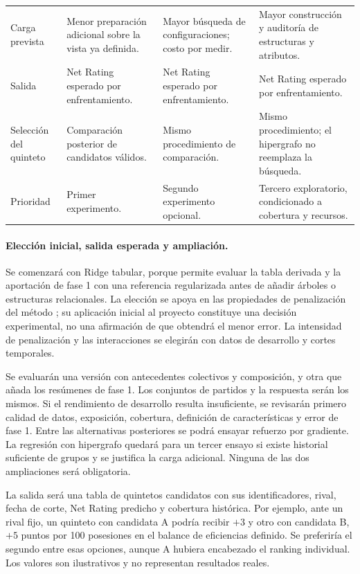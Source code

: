 \begin{longtable}{@{}>{\raggedright\arraybackslash}p{2.3cm}>{\raggedright\arraybackslash}p{3.55cm}>{\raggedright\arraybackslash}p{3.55cm}>{\raggedright\arraybackslash}p{3.55cm}@{}}
Carga prevista & Menor preparación adicional sobre la vista ya definida. & Mayor búsqueda de configuraciones; costo por medir. & Mayor construcción y auditoría de estructuras y atributos.\\
Salida & Net Rating esperado por enfrentamiento. & Net Rating esperado por enfrentamiento. & Net Rating esperado por enfrentamiento.\\
Selección del quinteto & Comparación posterior de candidatos válidos. & Mismo procedimiento de comparación. & Mismo procedimiento; el hipergrafo no reemplaza la búsqueda.\\
Prioridad & Primer experimento. & Segundo experimento opcional. & Tercero exploratorio, condicionado a cobertura y recursos.\\
\end{longtable}
\endgroup

\paragraph*{Elección inicial, salida esperada y ampliación.}
Se comenzará con Ridge tabular, porque permite evaluar la tabla derivada y la aportación de fase 1 con una referencia regularizada antes de añadir árboles o estructuras relacionales. La elección se apoya en las propiedades de penalización del método \cite{hoerl1970ridge}; su aplicación inicial al proyecto constituye una decisión experimental, no una afirmación de que obtendrá el menor error. La intensidad de penalización y las interacciones se elegirán con datos de desarrollo y cortes temporales.

Se evaluarán una versión con antecedentes colectivos y composición, y otra que añada los resúmenes de fase 1. Los conjuntos de partidos y la respuesta serán los mismos. Si el rendimiento de desarrollo resulta insuficiente, se revisarán primero calidad de datos, exposición, cobertura, definición de características y error de fase 1. Entre las alternativas posteriores se podrá ensayar refuerzo por gradiente. La regresión con hipergrafo quedará para un tercer ensayo si existe historial suficiente de grupos y se justifica la carga adicional. Ninguna de las dos ampliaciones será obligatoria.

La salida será una tabla de quintetos candidatos con sus identificadores, rival, fecha de corte, Net Rating predicho y cobertura histórica. Por ejemplo, ante un rival fijo, un quinteto con candidata A podría recibir $+3$ y otro con candidata B, $+5$ puntos por 100 posesiones en el balance de eficiencias definido. Se preferiría el segundo entre esas opciones, aunque A hubiera encabezado el ranking individual. Los valores son ilustrativos y no representan resultados reales.

